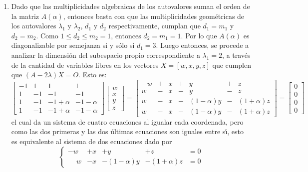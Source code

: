 \begin{solucion}
\begin{enumerate}[$a$)]
  \item Dado que las multiplicidades algebraicas de los autovalores suman el orden de la matriz $A(\alpha)$, entonces basta con que las multiplicidades geom\'etricas de los autovalores $\lambda_1$ y $\lambda_2$, $d_1$ y $d_2$ respectivamente, cumplan que $d_1 = m_1$ y $d_2 = m_2$. Como $1 \leq d_2 \leq m_2 = 1$, entonces $d_2 = m_1 = 1$. Por lo que $A(\alpha)$ es diagonalizable por semejanza si y s\'olo si $d_1 = 3$. Luego entonces, se procede a analizar la dimensi\'on del subespacio propio correspondiente a $\lambda_1 = 2$, a trav\'es de la cantidad de variables libres en los vectores $X = [w,x,y,z]$ que cumplen que $(A-2\lambda)X = O$. Esto es:
  \begin{equation*}
   \begin{bmatrix}
    -1 &  1 &  1 &  1 \\
     1 & -1 & -1 & -1 \\
     1 & -1 & -1 + \alpha & -1 - \alpha \\
     1 & -1 & -1 + \alpha & -1 - \alpha 
   \end{bmatrix}
   \begin{bmatrix}
    w \\ x \\ y \\ z
   \end{bmatrix}
   =
   \begin{bmatrix}
    -w & + & x & + & y & + & z \\
     w & - & x & - & y & - & z \\
     w & - & x & - & (1 - \alpha)y & - & (1 + \alpha)z \\
     w & - & x & - & (1 - \alpha)y & - & (1 + \alpha)z
   \end{bmatrix}
   =
   \begin{bmatrix}
    0 \\ 0 \\ 0 \\ 0
   \end{bmatrix}
  \end{equation*}
  el cual da un sistema de cuatro ecuaciones al igualar cada coordenada, pero como las dos primeras y las dos \'ultimas ecuaciones son iguales entre s\'{\i}, esto es equivalente al sistema de dos ecuaciones dado por
  \begin{equation*}
   \left\{
   \begin{matrix}
    -w & + x & + y & + z & = 0\\
    \phantom{-}w  & - x & - (1 - \alpha)y & - (1 + \alpha)z & = 0

\end{matrix}
\end{equation*}
\end{enumerate}
\end{solucion}
